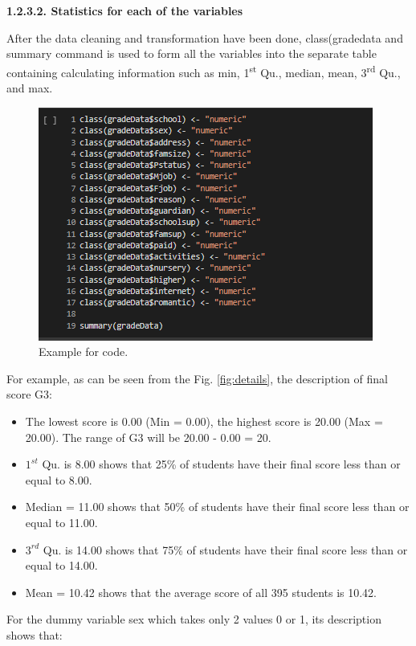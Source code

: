 \documentclass[a4paper]{article}
\begin{document}
\textbf{1.2.3.2. Statistics for each of the variables} \\ \newline
{}
After the data cleaning and transformation have been done, class(gradedata and summary command is used to form all the variables into the separate table containing calculating information such as min, 1\textsuperscript{st} Qu., median, mean, 3\textsuperscript{rd} Qu., and max.
\begin{figure}[H]
    \centering
    \includegraphics[scale = 1.5]{Images/6.PNG}
    \caption{Example for code.}
    \label{fig:Ex1}
\end{figure}
For example, as can be seen from the Fig. \ref{fig:details}, the description of final score G3:
\begin{itemize}
    \item The lowest score is 0.00 (Min = 0.00), the highest score is 20.00 (Max = 20.00). The range of G3 will be 20.00 - 0.00 = 20.
    \item $1^{st}$ Qu. is 8.00 shows that 25\% of students have their final score less than or equal to 8.00.
    \item Median = 11.00 shows that 50\% of students have their final score less than or equal to 11.00.
    \item $3^{rd}$ Qu. is 14.00 shows that 75\% of students have their final score less than or equal to 14.00.
    \item Mean = 10.42 shows that the average score of all 395 students is 10.42. \\
\end{itemize}
For the dummy variable sex which takes only 2 values 0 or 1, its description shows that:
\end{document}
